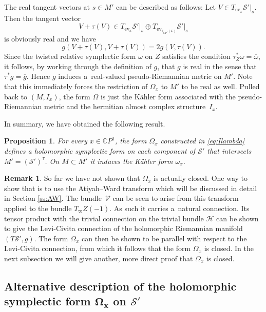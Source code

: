 \documentclass[pdftex]{sigma}
\numberwithin{equation}{section}
\newtheorem{Proposition}[Theorem]{Proposition}
\theoremstyle{definition}
\newtheorem{Remark}[Theorem]{Remark}
\newcommand\C{{\mathbb C}}
\begin{document}
The real tangent vectors at $s \in M'$ can be described as follows: Let $V \in
T_{\operatorname{ev}_x}\mathcal S'\vert_s$. Then the tangent vector
\[
V + \tau(V) \in T_{\operatorname{ev}_x}\mathcal S'\vert_s \oplus T_{\operatorname{ev}_{\tau_{\C P^1}(x)}}\mathcal S'\vert_s
\]
is obviously real and we have
\[
g(V+\tau(V), V+\tau(V)) = 2g(V, \tau(V)).
\]
Since the twisted relative symplectic form $\omega$ on $Z$ satisfies
the condition $\tau_Z^*\omega = \overline\omega$, it follows,
by working through the definition of $g$, that $g$ is real in the sense that $\tau^*g = \overline g$. Hence
$g$ induces a~real-valued pseudo-Riemannian metric on $M'$. Note that this immediately forces the restriction of
$\Omega_x$ to $M'$ to be real as well. Pulled back to $(M, I_x)$, the form $\Omega$ is just the K\"ahler form
associated with the pseudo-Riemannian metric and the hermitian almost complex structure~$I_x$.

In summary, we have obtained the following result.

\begin{Proposition}
For every $x \in \C P^1$, the form $\Omega_x$ constructed in \eqref{eq:Ilambda}
defines a holomorphic symplectic form on each component of $\mathcal S'$ that intersects $M'
 = (\mathcal S')^\tau$. On $M \subset M'$ it induces the K\"ahler form $\omega_x$.
\end{Proposition}

\begin{Remark}
So far we have not shown that $\Omega_x$ is actually closed.
One way to show that is to use the Atiyah--Ward transform which will be discussed in detail in Section \ref{ss:AW}.
The bundle~$\mathcal V$ can be seen to arise from this transform applied to the bundle $T_\varpi Z(-1)$.
As such it carries a~natural connection. Its tensor product with the trivial connection on the trivial
bundle $\mathcal H$ can be shown to give the Levi-Civita connection of the holomorphic Riemannian manifold
$(T\mathcal S', g)$. The form $\Omega_x$ can then be shown to be parallel with respect to
the Levi-Civita connection, from which it follows that the form $\Omega_x$ is closed.
In the next subsection we will give another, more direct proof that $\Omega_x$ is closed.
\end{Remark}

\subsection[Alternative description of the holomorphic symplectic form Omega\_x on S']{Alternative description of the holomorphic symplectic form $\boldsymbol{\Omega_x}$ on $\boldsymbol{\mathcal{S}'}$}\label{ss:Omega}
\end{document}
